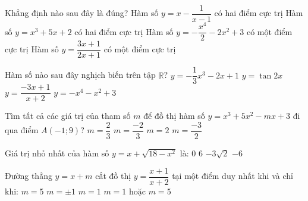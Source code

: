 \begin{ex}%
	Khẳng định nào sau đây là đúng?	
	\choice
	{Hàm số $ y=x-\dfrac{1}{x-1} $ có hai điểm cực trị}
	{Hàm số $ y=x^3+5x+2 $ có hai điểm cực trị}
	{\True Hàm số $ y=-\dfrac{x^4}{2}-2x^2+3 $ có một điểm cực trị}
	{Hàm số $ y=\dfrac{3x+1}{2x+1} $ có một điểm cực trị}
	\loigiai{}
\end{ex}
\begin{ex}%
	Hàm số nào sau đây nghịch biến trên tập $ \mathbb{R} $?
	\choice
	{\True $ y=-\dfrac{1}{3}x^3-2x+1 $}
	{$ y=\tan 2x $}
	{$ y=\dfrac{-3x+1}{x+2} $}
	{$ y=-x^4-x^2+3 $}
	\loigiai{}
\end{ex}
\begin{ex}%
	Tìm tất cả các giá trị của tham số $ m $ để đồ thị hàm số $ y=x^3+5x^2-mx+3 $ đi qua điểm $ A(-1;9) $?
	\choice
	{$ m=\dfrac{2}{3} $}
	{$ m=\dfrac{-2}{3} $}
	{\True $ m=2 $}
	{$ m=\dfrac{-3}{2} $}
\end{ex}
\begin{ex}%
	Giá trị nhỏ nhất của hàm số $ y=x+\sqrt{18-x^2} $ là:
	\choice
	{$ 0 $}
	{$ 6 $}
	{\True $ -3\sqrt{2} $}
	{$ -6 $}
\end{ex}
\begin{ex}%
	Đường thẳng $ y=x+m $ cắt đồ thị $ y=\dfrac{x+1}{x+2} $ tại một điểm duy nhất khi và chỉ khi:
	\choice
	{$ m=5 $}
	{$ m=\pm 1 $}
	{$ m=1 $}
	{\True $ m=1 $ hoặc $ m=5 $}
\end{ex}
